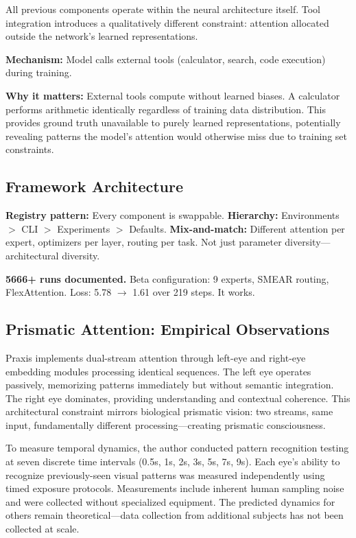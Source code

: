 \documentclass{article}
\begin{document}
All previous components operate within the neural architecture itself. Tool integration introduces a qualitatively different constraint: attention allocated outside the network's learned representations.

\textbf{Mechanism:} Model calls external tools (calculator, search, code execution) during training.

\textbf{Why it matters:} External tools compute without learned biases. A calculator performs arithmetic identically regardless of training data distribution. This provides ground truth unavailable to purely learned representations, potentially revealing patterns the model's attention would otherwise miss due to training set constraints.

\subsection{Framework Architecture}

\textbf{Registry pattern:} Every component is swappable. \textbf{Hierarchy:} Environments $>$ CLI $>$ Experiments $>$ Defaults. \textbf{Mix-and-match:} Different attention per expert, optimizers per layer, routing per task. Not just parameter diversity—architectural diversity.

\textbf{5666+ runs documented.} Beta configuration: 9 experts, SMEAR routing, FlexAttention. Loss: 5.78 $\rightarrow$ 1.61 over 219 steps. It works.

\subsection{Prismatic Attention: Empirical Observations}

Praxis implements dual-stream attention through left-eye and right-eye embedding modules processing identical sequences. The left eye operates passively, memorizing patterns immediately but without semantic integration. The right eye dominates, providing understanding and contextual coherence. This architectural constraint mirrors biological prismatic vision: two streams, same input, fundamentally different processing—creating prismatic consciousness.

To measure temporal dynamics, the author conducted pattern recognition testing at seven discrete time intervals (0.5s, 1s, 2s, 3s, 5s, 7s, 9s). Each eye's ability to recognize previously-seen visual patterns was measured independently using timed exposure protocols. Measurements include inherent human sampling noise and were collected without specialized equipment. The predicted dynamics for others remain theoretical—data collection from additional subjects has not been collected at scale.
\end{document}
